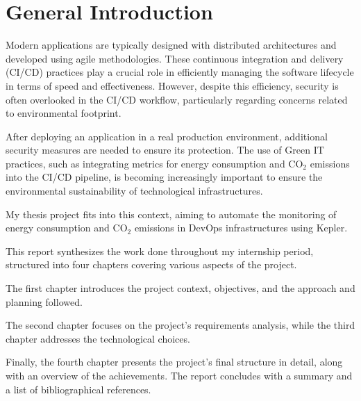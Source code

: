 \chapter*{General Introduction}

Modern applications are typically designed with distributed architectures and developed using agile methodologies. These continuous integration and delivery (CI/CD) practices play a crucial role in efficiently managing the software lifecycle in terms of speed and effectiveness. However, despite this efficiency, security is often overlooked in the CI/CD workflow, particularly regarding concerns related to environmental footprint.

After deploying an application in a real production environment, additional security measures are needed to ensure its protection. The use of Green IT practices, such as integrating metrics for energy consumption and CO$_2$ emissions into the CI/CD pipeline, is becoming increasingly important to ensure the environmental sustainability of technological infrastructures.

My thesis project fits into this context, aiming to automate the monitoring of energy consumption and CO$_2$ emissions in DevOps infrastructures using Kepler. 

\vspace{10pt} %

This report synthesizes the work done throughout my internship period, structured into four chapters covering various aspects of the project. 

\vspace{10pt} 

The first chapter introduces the project context, objectives, and the approach and planning followed. 

\vspace{10pt} 

The second chapter focuses on the project's requirements analysis, while the third chapter addresses the technological choices. 

\vspace{10pt} 

Finally, the fourth chapter presents the project's final structure in detail, along with an overview of the achievements. The report concludes with a summary and a list of bibliographical references.

